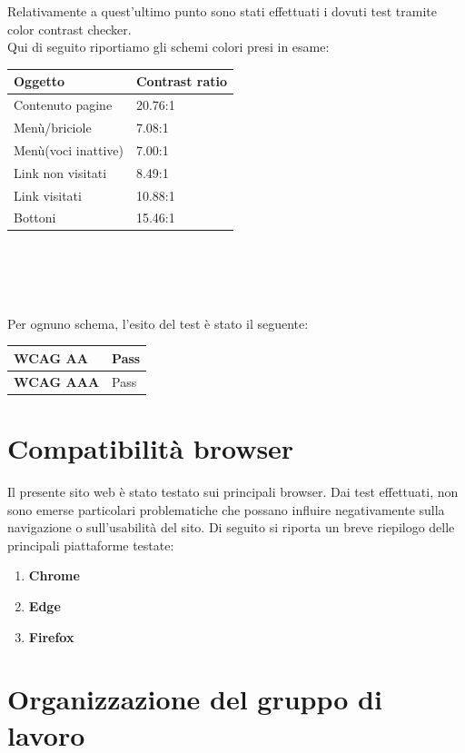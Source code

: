 Relativamente a quest'ultimo punto sono stati effettuati i dovuti test tramite color contrast checker.\\
Qui di seguito riportiamo gli schemi colori presi in esame:\\

\begin{tabular}{l|l}
	\hline
	 \textbf{Oggetto} & \textbf{Contrast ratio}  \\
	\hline
	  Contenuto pagine & 20.76:1  \\
	\hline
	Menù/briciole & 7.08:1 \\
	\hline
	Menù(voci inattive) & 7.00:1 \\
	\hline
	Link non visitati & 8.49:1 \\
	\hline
	Link visitati & 10.88:1 \\
	\hline
	Bottoni & 15.46:1 \\
	\hline 
\end{tabular}\\
\newline
\newline
\\
\\
\\
Per ognuno schema, l'esito del test è stato il seguente:\\
\begin{tabular}{l|l}
	\hline
	 \textbf{WCAG AA} & Pass  \\
	\hline
	 \textbf{WCAG AAA} & Pass  \\
	\hline
\end{tabular}


\section{Compatibilità browser}

Il presente sito web è stato testato sui principali browser. Dai test effettuati, non sono emerse particolari problematiche che possano influire negativamente sulla navigazione o sull'usabilità del sito.
Di seguito si riporta un breve riepilogo delle principali piattaforme testate:
	\begin{enumerate}
		\item \textbf{Chrome}
		\item \textbf{Edge}
		\item \textbf{Firefox}
	\end{enumerate}

\section{Organizzazione del gruppo di lavoro}

